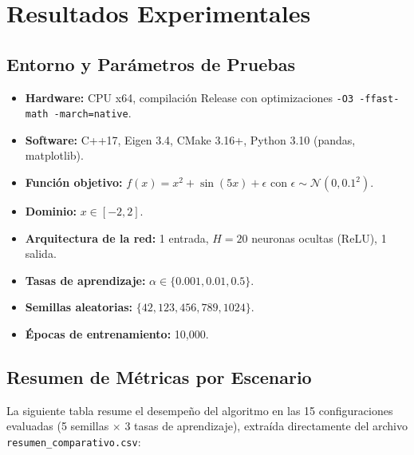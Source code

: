 \documentclass[12pt,a4paper]{article}
\theoremstyle{definition}
\begin{document}
\section{Resultados Experimentales}\label{sec:resultados}

\subsection{Entorno y Par\'{a}metros de Pruebas}
\begin{itemize}
    \item \textbf{Hardware:} CPU x64, compilaci\'{o}n Release con optimizaciones \texttt{-O3 -ffast-math -march=native}.
    \item \textbf{Software:} C++17, Eigen 3.4, CMake 3.16+, Python 3.10 (pandas, matplotlib).
    \item \textbf{Funci\'{o}n objetivo:} $f(x) = x^2 + \sin(5x) + \epsilon$ con $\epsilon \sim \mathcal{N}(0, 0.1^2)$.
    \item \textbf{Dominio:} $x \in [-2, 2]$.
    \item \textbf{Arquitectura de la red:} 1 entrada, $H = 20$ neuronas ocultas (ReLU), 1 salida.
    \item \textbf{Tasas de aprendizaje:} $\alpha \in \{0.001, 0.01, 0.5\}$.
    \item \textbf{Semillas aleatorias:} $\{42, 123, 456, 789, 1024\}$.
    \item \textbf{\'{E}pocas de entrenamiento:} 10,000.
\end{itemize}

\subsection{Resumen de M\'{e}tricas por Escenario}

La siguiente tabla resume el desempe\~{n}o del algoritmo en las 15 configuraciones evaluadas (5 semillas $\times$ 3 tasas de aprendizaje), extra\'{i}da directamente del archivo \texttt{resumen\_comparativo.csv}:
\end{document}
